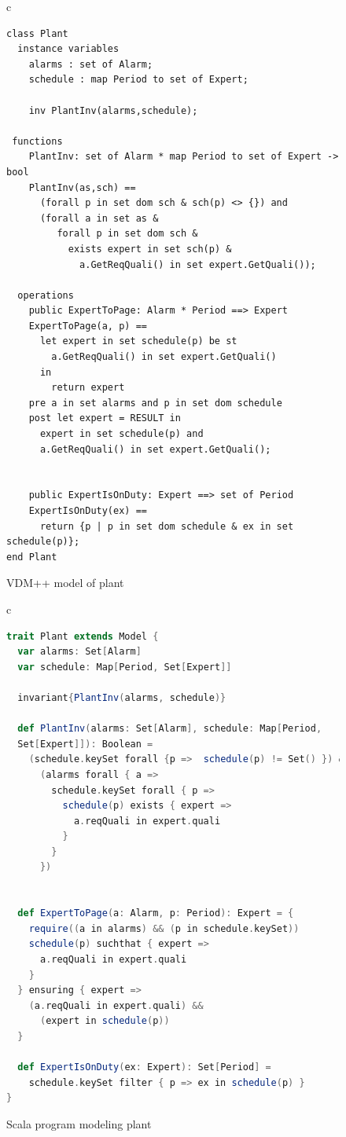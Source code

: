 \begin{figure}
\begin{center}
\begin{tabular}{c}
\begin{lstlisting}[language=vdm]
class Plant
  instance variables
    alarms : set of Alarm;
    schedule : map Period to set of Expert;
    
    inv PlantInv(alarms,schedule);

 functions
    PlantInv: set of Alarm * map Period to set of Expert -> bool
    PlantInv(as,sch) ==
      (forall p in set dom sch & sch(p) <> {}) and
      (forall a in set as &
         forall p in set dom sch & 
           exists expert in set sch(p) &
             a.GetReqQuali() in set expert.GetQuali());

  operations
    public ExpertToPage: Alarm * Period ==> Expert
    ExpertToPage(a, p) ==
      let expert in set schedule(p) be st
        a.GetReqQuali() in set expert.GetQuali()
      in
        return expert
    pre a in set alarms and p in set dom schedule
    post let expert = RESULT in
      expert in set schedule(p) and
      a.GetReqQuali() in set expert.GetQuali();
		
		 
    public ExpertIsOnDuty: Expert ==> set of Period
    ExpertIsOnDuty(ex) ==
      return {p | p in set dom schedule & ex in set schedule(p)};
end Plant
\end{lstlisting}
\end{tabular}
\end{center}
\caption{VDM++ model of plant}
\label{fig:plant-vdm}
\end{figure}

\begin{figure}
\begin{center}
\begin{tabular}{c}
\begin{lstlisting}[language=scala]
trait Plant extends Model {
  var alarms: Set[Alarm]
  var schedule: Map[Period, Set[Expert]]

  invariant{PlantInv(alarms, schedule)}

  def PlantInv(alarms: Set[Alarm], schedule: Map[Period, 
  Set[Expert]]): Boolean =
    (schedule.keySet forall {p =>  schedule(p) != Set() }) &&
      (alarms forall { a =>
        schedule.keySet forall { p =>
          schedule(p) exists { expert =>
            a.reqQuali in expert.quali
          }
        }
      })


  def ExpertToPage(a: Alarm, p: Period): Expert = {
    require((a in alarms) && (p in schedule.keySet))
    schedule(p) suchthat { expert =>
      a.reqQuali in expert.quali
    }
  } ensuring { expert =>
    (a.reqQuali in expert.quali) &&
      (expert in schedule(p))
  }

  def ExpertIsOnDuty(ex: Expert): Set[Period] =
    schedule.keySet filter { p => ex in schedule(p) }
}
\end{lstlisting}
\end{tabular}
\end{center}
\caption{Scala program modeling plant}
\label{fig:plant-scala}
\end{figure}


